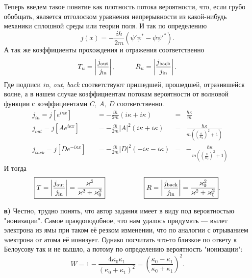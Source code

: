 Теперь введем такое понятие как плотность потока вероятности, что, если грубо обобщать, является отголоском уравнения непрерывности из какой-нибудь механики сплошной среды или теории поля. И так по определению
\begin{equation*}
	j(x) = -\frac{i \hbar}{2 m} (\psi' \psi^* - \psi \psi'^*).
\end{equation*}
А так же коэффициенты прохождения и отражения соответственно
\begin{equation*}
	T_u = \left| \frac{j_\text{out}}{j_\text{in}}\right|,
	\hspace{1 cm}
	R_u = \left| \frac{j_\text{back}}{j_\text{in}}\right|.
\end{equation*}
Где подписи \textit{in}, \textit{out}, \textit{back} соответствуют пришедшей, прошедшей, отразившейся волне, а в нашем случае коэффициентам потокам вероятности от волновой функции с коэффициентами $C,\ A, \ D$ соответственно.
\begin{equation*}
	\begin{aligned}
		&j_\textit{in} = j [e^{i \kappa x}]& &= - \frac{i \hbar}{2 m}(i \kappa + i \kappa) &=& \frac{\hbar \kappa}{m}\\
		&j_\textit{out} = j [A e^{i \kappa x}]& &= - \frac{i \hbar}{2 m}|A|^2(i \kappa + i \kappa) &=& \frac{\hbar \kappa}{m\left(\left(\frac{\kappa}{\kappa_0}\right)^2 + 1\right)}\\
		&j_\textit{back} = j [D e^{-i \kappa x}]& &= - \frac{i \hbar}{2 m} |D|^2( -i \kappa - i \kappa) &=& -\frac{\hbar \kappa}{m\left(\left(\frac{\kappa}{\kappa_0}\right)^2 + 1\right)}
	\end{aligned}
\end{equation*}
И тогда
\begin{equation*}
	\boxed{T = \left|\frac{j_\text{out}}{j_\text{in}}\right| = \frac{\kappa^2}{\kappa^2 + \kappa_0^2}}
	\hspace{2 cm}
	\boxed{R = \left|\frac{j_\text{back}}{j_\text{in}}\right| = \frac{\kappa_0^2}{\kappa^2 + \kappa_0^2}}.
\end{equation*}


\phantom{42}

\textbf{в)} Честно, трудно понять, что автор задания имеет в виду под вероятностью "ионизации". Самое правдоподобное, что нам удалось придумать --- вылет электрона из ямы при таком её резком изменении, что по аналогии с отрыванием электрона от атома её ионизует. Однако посчитать что-то близкое по ответу к Белоусову так и не вышло, а потому по определению вероятность "ионизации":
\begin{equation*}
	W = 1 - \frac{4 \kappa_0 \kappa_1}{(\kappa_0 + \kappa_1)^2} = \left(\frac{\kappa_0 - \kappa_1}{\kappa_0 + \kappa_1}\right)^2.
\end{equation*}

